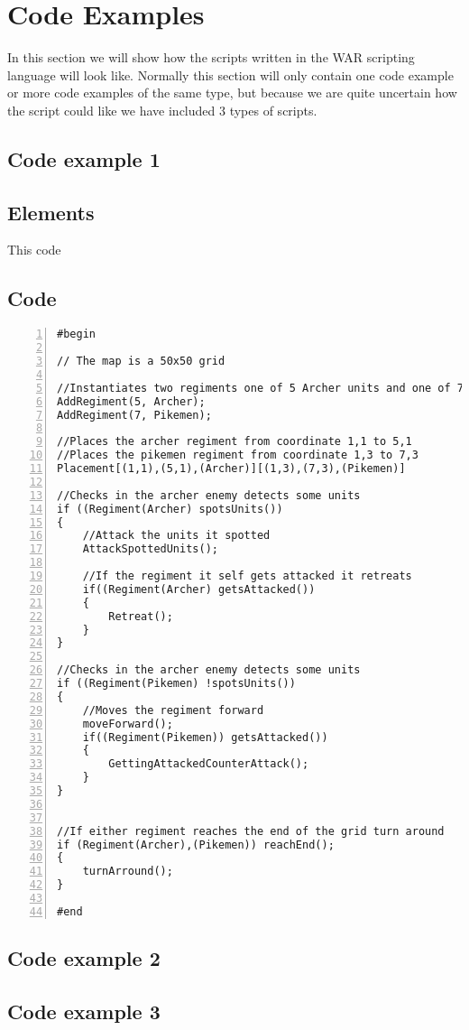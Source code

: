 \section{Code Examples}
	In this section we will show how the scripts written in the WAR scripting language will look like.
	Normally this section will only contain one code example or more code examples of the same type, 
	but because we are quite uncertain how the script could like we have included 3 types of scripts.
	\subsection{Code example 1}
		\subsection{Elements}
			This code 
		\subsection{Code}
			\begin{lstlisting}[basicstyle=\small\sffamily,
				keywords={break,case,const,continue,default,else,enum,
				for,if,return,switch,while,do,long,void,int,float,double,
				char,struct,typedef,include,size\_t},
				keywordstyle={\color{blue}},
				comment={[l]{//}}, morecomment={[s]{/*}{*/}}, commentstyle=\itshape,
				columns={[l]flexible}, numbers=left, numberstyle=\tiny,
				frameround=fftt, frame=shadowbox, captionpos=b,
				caption={Code example 1},
				label=LST:code1]
#begin

// The map is a 50x50 grid

//Instantiates two regiments one of 5 Archer units and one of 7 Pikemen units:
AddRegiment(5, Archer);
AddRegiment(7, Pikemen);

//Places the archer regiment from coordinate 1,1 to 5,1
//Places the pikemen regiment from coordinate 1,3 to 7,3
Placement[(1,1),(5,1),(Archer)][(1,3),(7,3),(Pikemen)]

//Checks in the archer enemy detects some units
if ((Regiment(Archer) spotsUnits())
{
	//Attack the units it spotted
	AttackSpottedUnits();

	//If the regiment it self gets attacked it retreats
	if((Regiment(Archer) getsAttacked())
	{
		Retreat();
	}
}

//Checks in the archer enemy detects some units
if ((Regiment(Pikemen) !spotsUnits())
{
	//Moves the regiment forward	
	moveForward();
	if((Regiment(Pikemen)) getsAttacked())
	{
		GettingAttackedCounterAttack();
	}
}


//If either regiment reaches the end of the grid turn around
if (Regiment(Archer),(Pikemen)) reachEnd();
{
	turnArround();
}

#end

		 	\end{lstlisting}

	\subsection{Code example 2}
	\subsection{Code example 3}